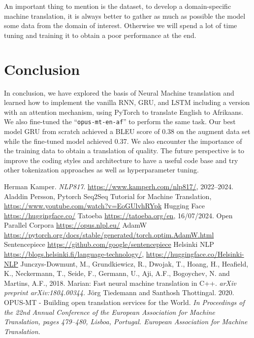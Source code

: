 An important thing to mention is the dataset, to develop a domain-specific machine translation, it is always better to gather as much as possible the model some data from the domain of interest. Otherwise we  will spend a lot of time tuning and training it to obtain a poor performance at the end.


\section{Conclusion}
In conclusion, we have explored the basis of Neural Machine translation and learned how to implement the vanilla RNN, GRU, and LSTM including a version with an attention mechanism, using PyTorch to translate English to Afrikaans. We also fine-tuned the ``\texttt{opus-mt-en-af}'' to perform the same task. Our best model GRU from scratch achieved a BLEU score of 0.38 on the augment data set while the fine-tuned model achieved 0.37. We also encounter the importance of the training data to obtain a translation of quality. The future perspective is to improve the coding styles and architecture to have a useful code base and try other tokenization approaches as well as hyperparameter tuning.

\begin{thebibliography}{1}

	 Herman Kamper. \emph{NLP817}. \href{https://www.kamperh.com/nlp817/}{https://www.kamperh.com/nlp817/}, 2022--2024.
	 Aladdin Persson, Pytorch Seq2Seq Tutorial for Machine Translation, \href{https://www.youtube.com/watch?v=EoGUlvhRYpk}{https://www.youtube.com/watch?v=EoGUlvhRYpk}
	 Hugging Face \href{https://huggingface.co/}{https://huggingface.co/}
	 Tatoeba \href{https://tatoeba.org/en}{https://tatoeba.org/en}, 16/07/2024.
	 Open Parallel Corpora \href{https://opus.nlpl.eu/}{https://opus.nlpl.eu/}
	 AdamW \href{https://pytorch.org/docs/stable/generated/torch.optim.AdamW.html}{https://pytorch.org/docs/stable/generated/torch.optim.AdamW.html}
	 Sentencepiece \href{https://github.com/google/sentencepiece}{https://github.com/google/sentencepiece}
	 Helsinki NLP \href{https://blogs.helsinki.fi/language-technology/}{https://blogs.helsinki.fi/language-technology/}, \href{https://huggingface.co/Helsinki-NLP}{https://huggingface.co/Helsinki-NLP}
	 Junczys-Dowmunt, M., Grundkiewicz, R., Dwojak, T., Hoang, H., Heafield, K., Neckermann, T., Seide, F., Germann, U., Aji, A.F., Bogoychev, N. and Martins, A.F., 2018. Marian: Fast neural machine translation in C++. \textit{arXiv preprint arXiv:1804.00344.}
	 Jörg Tiedemann and Santhosh Thottingal. 2020. OPUS-MT - Building open translation services for the World. \textit{In Proceedings of the 22nd Annual Conference of the European Association for Machine Translation, pages 479–480, Lisboa, Portugal. European Association for Machine Translation.}
\end{thebibliography}